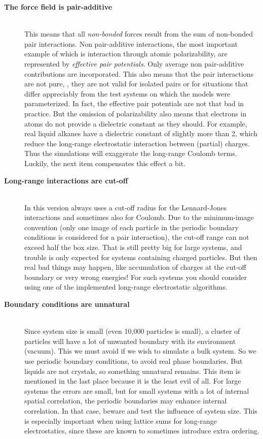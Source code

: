 \begin{description}
\item[{\bf The force field is pair-additive}]\mbox{}\\
This means that all {\em non-bonded} forces result from the sum of
non-bonded pair interactions. Non pair-additive interactions, the most
important example of which is interaction through atomic
polarizability, are represented by {\em effective pair
potentials}. Only average non pair-additive contributions are
incorporated. This also means that the pair interactions are not pure,
{\ie}, they are not valid for isolated pairs or for situations
that differ appreciably from the test systems on which the models were
parameterized. In fact, the effective pair potentials are not that bad
in practice. But the omission of polarizability also means that
electrons in atoms do not provide a dielectric constant as they
should. For example, real liquid alkanes have a dielectric constant of
slightly more than 2, which reduce the long-range electrostatic
interaction between (partial) charges. Thus the simulations will
exaggerate the long-range Coulomb terms. Luckily, the next item
compensates this effect a bit.

\item[{\bf Long-range interactions are cut-off}]\mbox{}\\
In this version {\gromacs} always uses a cut-off radius for the
Lennard-Jones interactions and sometimes also for Coulomb. 
Due to the minimum-image convention (only one image of
each particle in the periodic boundary conditions is considered for a
pair interaction), the cut-off range can not exceed half the box
size. That is still pretty big for large systems, and trouble is only
expected for systems containing charged particles. But then real bad
things may happen, like accumulation of charges at the cut-off
boundary or very wrong energies! For such systems you should consider
using one of the implemented long-range electrostatic algorithms.

\item[{\bf Boundary conditions are unnatural}]\mbox{}\\
Since system size is small (even 10,000 particles is small), a cluster
of particles will have a lot of unwanted boundary with its environment
(vacuum). This we must avoid if we wish to simulate a bulk system. So
we use periodic boundary conditions, to avoid real phase
boundaries. But liquids are not crystals, so something unnatural
remains. This item is mentioned in the last place because it is the
least evil of all. For large systems the errors are small, but for
small systems with a lot of internal spatial correlation, the periodic
boundaries may enhance internal correlation. In that case, beware and
test the influence of system size. This is especially important when
using lattice sums for long-range electrostatics, since these are known
to sometimes introduce extra ordering.
\end{description}

